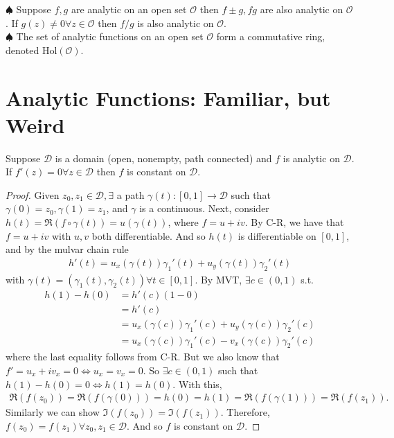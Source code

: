 \documentclass{article}
\theoremstyle{definition}
\newcommand{\nn}{\nonumber}
\begin{document}
\noindent $\spadesuit$ Suppose $f,g$ are analytic on an open set $\mathcal{O}$ then $f\pm g, fg$ are also analytic on $\mathcal{O}$. If $g(z) \neq 0 \forall z \in \mathcal{O}$ then $f/g$ is also analytic on $\mathcal{O}$. \\

\noindent $\spadesuit$ The set of analytic functions on an open set $\mathcal{O}$ form a commutative ring, denoted $\text{Hol}(\mathcal{O})$.


\section{Analytic Functions: Familiar, but Weird}

Suppose $\mathcal{D}$ is a domain (open, nonempty, path connected) and $f$ is analytic on $\mathcal{D}$. If $f'(z) =0 \forall z \in \mathcal{D}$ then $f$ is constant on $\mathcal{D}$. 

\begin{proof}
	Given $z_0, z_1 \in \mathcal{D}, \exists$ a path $\gamma(t) : [0,1] \to \mathcal{D}$ such that $\gamma(0) = z_0, \gamma(1) = z_1$, and $\gamma$ is a continuous. Next, consider $h(t) = \Re(f\circ \gamma(t)) = u(\gamma(t))$, where $f = u+ iv$. By C-R, we have that $f = u+ iv$ with $u,v$ both differentiable. And so $h(t)$ is differentiable on $[0,1]$, and by the mulvar chain rule
	\begin{align}
	h'(t) = u_x(\gamma(t)) \gamma_1'(t) + u_y(\gamma(t))\gamma_2'(t)
	\end{align}
	with $\gamma(t) = (\gamma_1(t), \gamma_2(t)) \forall t \in [0,1]$. By MVT, $\exists c \in (0,1)$ s.t.
	\begin{align}
	h(1) - h(0) &= h'(c)(1-0)\nn\\
	&= h'(c)\nn\\
	&= u_x(\gamma(c))\gamma_1'(c) + u_y(\gamma(c))\gamma_2'(c) \nn\\
	&= u_x(\gamma(c))\gamma_1'(c) - v_x(\gamma(c))\gamma_2'(c)
	\end{align}
	where the last equality follows from C-R. But we also know that $f' = u_x + iv_x = 0 \iff u_x = v_x = 0$. So $\exists c \in (0,1)$ such that $h(1) - h(0) = 0 \iff h(1) = h(0)$. With this,
	\begin{align}
	\Re(f(z_0)) = \Re(f(\gamma(0))) = h(0) = h(1) = \Re(f(\gamma(1))) = \Re(f(z_1)).
	\end{align}
	Similarly we can show $\Im(f(z_0)) = \Im(f(z_1))$. Therefore, $f(z_0) = f(z_1) \forall z_0, z_1 \in \mathcal{D}$. And so $f$ is constant on $\mathcal{D}$.   
\end{proof}   
\end{document}

